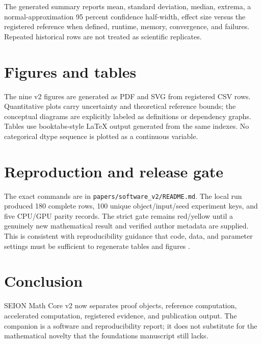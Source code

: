 \documentclass[11pt]{amsart}
\begin{document}
The generated summary reports mean, standard deviation, median, extrema, a
normal-approximation 95 percent confidence half-width, effect size versus the
registered reference when defined, runtime, memory, convergence, and
failures. Repeated historical rows are not treated as scientific replicates.

\section{Figures and tables}

The nine v2 figures are generated as PDF and SVG from registered CSV rows.
Quantitative plots carry uncertainty and theoretical reference bounds; the
conceptual diagrams are explicitly labeled as definitions or dependency
graphs. Tables use booktabs-style LaTeX output generated from the same
indexes. No categorical dtype sequence is plotted as a continuous variable.

\section{Reproduction and release gate}

The exact commands are in \texttt{papers/software\_v2/README.md}. The local
run produced 180 complete rows, 100 unique object/input/seed experiment keys,
and five CPU/GPU parity records. The strict gate remains red/yellow until a
genuinely new mathematical result and verified author metadata are supplied.
This is consistent with reproducibility guidance that code, data, and
parameter settings must be sufficient to regenerate tables and figures
\cite{SISCInstructions}.

\section{Conclusion}

SEION Math Core v2 now separates proof objects, reference computation,
accelerated computation, registered evidence, and publication output. The
companion is a software and reproducibility report; it does not substitute
for the mathematical novelty that the foundations manuscript still lacks.



\end{document}
